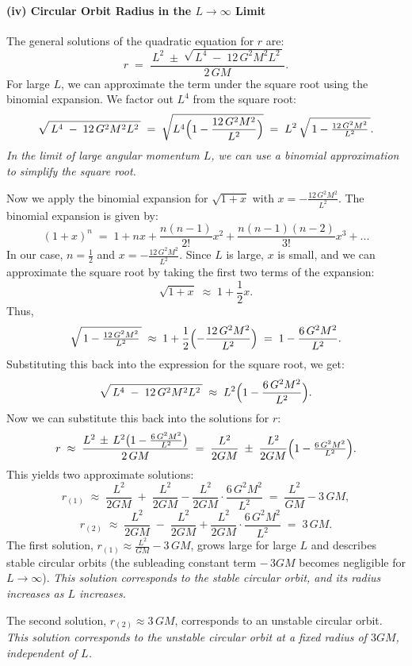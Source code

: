 \paragraph{(iv) Circular Orbit Radius in the $L \rightarrow \infty$ Limit}

The general solutions of the quadratic equation for $r$ are:
\[
r
\;=\;
\frac{\,L^2 \;\pm\; \sqrt{\,L^4 \;-\; 12\,G^2 M^2 L^2\,}}{\,2\,GM\,}.
\]
For large $L$, we can approximate the term under the square root using the binomial expansion. We factor out $L^4$ from the square root:
\[
\sqrt{\,L^4 \;-\; 12\,G^2 M^2 L^2\,}
\;=\;
\sqrt{L^4 \Bigl(1 - \frac{12\,G^2 M^2}{L^2}\Bigr)}
\;=\;
L^2\,\sqrt{\,1 - \tfrac{12\,G^2 M^2}{L^2}\,}.
\]
\textit{In the limit of large angular momentum $L$, we can use a binomial approximation to simplify the square root.}

Now we apply the binomial expansion for $\sqrt{1+x}$ with $x = -\frac{12\,G^2 M^2}{L^2}$. The binomial expansion is given by:
\[
(1+x)^n \;=\; 1 + nx + \frac{n(n-1)}{2!}x^2 + \frac{n(n-1)(n-2)}{3!}x^3 + ...
\]
In our case, $n = \frac{1}{2}$ and $x = -\frac{12\,G^2 M^2}{L^2}$. Since $L$ is large, $x$ is small, and we can approximate the square root by taking the first two terms of the expansion:
\[
\sqrt{1+x} \;\approx\; 1 + \frac{1}{2}x.
\]
Thus,
\[
\sqrt{\,1 - \tfrac{12\,G^2 M^2}{L^2}\,}
\;\approx\;
1 + \frac{1}{2}\Bigl(-\frac{12\,G^2 M^2}{L^2}\Bigr)
\;=\;
1 - \frac{6\,G^2 M^2}{L^2}.
\]
Substituting this back into the expression for the square root, we get:
\[
\sqrt{\,L^4 \;-\; 12\,G^2 M^2 L^2\,}
\;\approx\;
L^2 \Bigl(1 - \frac{6\,G^2 M^2}{L^2}\Bigr).
\]
Now we can substitute this back into the solutions for $r$:
\[
r
\;\approx\;
\frac{L^2 \,\pm\, L^2\bigl(1 - \tfrac{6\,G^2 M^2}{L^2}\bigr)}{\,2\,GM\,}
\;=\;
\frac{L^2}{2GM} \;\pm\;
\frac{L^2}{2GM}
\Bigl(1 - \tfrac{6\,G^2 M^2}{L^2}\Bigr).
\]
This yields two approximate solutions:
\[
r_{(1)}
\;\approx\;
\frac{L^2}{2GM} \;+\; \frac{L^2}{2GM} - \frac{L^2}{2GM} \cdot \frac{6\,G^2 M^2}{L^2}
\;=\;
\frac{L^2}{GM} - 3\,GM,
\]
\[
r_{(2)}
\;\approx\;
\frac{L^2}{2GM} \;-\; \frac{L^2}{2GM} + \frac{L^2}{2GM} \cdot \frac{6\,G^2 M^2}{L^2}
\;=\;
3\,GM.
\]
The first solution, $r_{(1)} \approx \tfrac{L^2}{GM} - 3\,GM$, grows large for large $L$ and describes stable circular orbits (the subleading constant term $-\,3GM$ becomes negligible for $L \to \infty$).
\textit{This solution corresponds to the stable circular orbit, and its radius increases as $L$ increases.}

The second solution, $r_{(2)} \approx 3\,GM$, corresponds to an unstable circular orbit.
\textit{This solution corresponds to the unstable circular orbit at a fixed radius of $3GM$, independent of $L$.}

